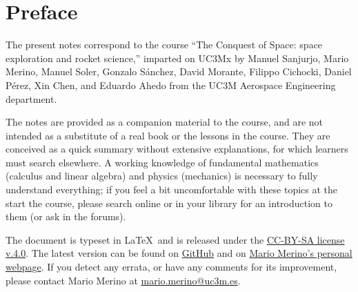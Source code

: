 \section*{Preface}

The present notes correspond to the course ``The Conquest of 
Space: space exploration and rocket science,'' imparted on UC3Mx by
Manuel Sanjurjo,
Mario Merino, 
Manuel Soler,
Gonzalo Sánchez,
David Morante,
Filippo Cichocki,
Daniel Pérez,
Xin Chen, and
Eduardo Ahedo 
from the UC3M Aerospace Engineering department.

The notes are provided as a companion material to the course, and are not
intended as a substitute of a real book or the lessons in the course. They are
conceived as a quick summary without extensive explanations, for which
learners must search elsewhere.  A working  knowledge
of fundamental mathematics (calculus and linear algebra) and physics
(mechanics) is necessary to fully understand everything; 
if you feel a bit uncomfortable with these topics at the start the course, 
please search online or in your library for an introduction to them (or 
ask in the forums).

The document is typeset in \LaTeX\ and is released under the 
\href{https://creativecommons.org/licenses/by-nc-sa/4.0/}{CC-BY-SA 
license v.4.0}. The latest version can be found on
\href{https://github.com/Awale/conquest-of-space-notes/}{GitHub} and
on \href{http://mariomerino.uc3m.es/}{Mario Merino's personal webpage}. 
If you detect any errata, or have any comments for its improvement, 
please contact Mario Merino at 
\href{mailto:mario.merino@uc3m.es}{mario.merino@uc3m.es}.



